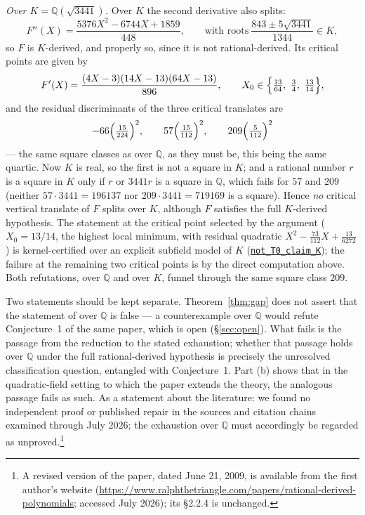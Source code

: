 \documentclass[11pt]{amsart}
\newcommand{\Q}{\mathbb{Q}}
\newcommand{\repourl}{https://github.com/hirokifukui/rd-quartics-classification}
\newcommand{\repotag}{v1.1.0}
\newcommand{\leanline}[3]{\href{\repourl/blob/\repotag/#1\#L#2}{\texttt{#3}}}
\begin{document}
\emph{Over $K=\Q(\sqrt{3441})$.}  Over $K$ the second derivative also
splits:
\[
F''(X)=\frac{5376X^2-6744X+1859}{448},\qquad
\text{with roots}\ \frac{843\pm 5\sqrt{3441}}{1344}\in K,
\]
so $F$ is $K$-derived, and properly so, since it is not
rational-derived.  Its critical points are given by
\[
F'(X)=\frac{(4X-3)(14X-13)(64X-13)}{896},\qquad
X_0\in\Bigl\{\tfrac{13}{64},\ \tfrac34,\ \tfrac{13}{14}\Bigr\},
\]
and the residual discriminants of the three critical translates are
\[
-66\Bigl(\tfrac{15}{224}\Bigr)^2,\qquad
57\Bigl(\tfrac{15}{112}\Bigr)^2,\qquad
209\Bigl(\tfrac{5}{112}\Bigr)^2
\]
--- the same square classes as over $\Q$, as they must be, this being
the same quartic.  Now $K$ is real, so the first is not a square in
$K$; and a rational number $r$ is a square in $K$ only if $r$ or
$3441r$ is a square in $\Q$, which fails for $57$ and $209$ (neither
$57\cdot 3441=196137$ nor $209\cdot 3441=719169$ is a square).  Hence
\emph{no} critical vertical translate of $F$ splits over $K$, although
$F$ satisfies the full $K$-derived hypothesis.  The statement at the
critical point selected by the argument ($X_0=13/14$, the highest local
minimum, with residual quadratic
$X^2-\tfrac{73}{112}X+\tfrac{13}{6272}$) is kernel-certified over an
explicit subfield model of $K$
(\leanline{Gap/BMThm7Transcript.lean}{977}{not\_T0\_claim\_K}); the
failure at the remaining two critical points is by the direct
computation above.  Both refutations, over $\Q$ and over $K$, funnel
through the same square class $209$.

Two statements should be kept separate.
Theorem~\ref{thm:gap} does not assert that the statement of
{\cite[Thm.~7]{BM2000}} over $\Q$ is false --- a counterexample over
$\Q$ would refute Conjecture~1 of the same paper, which is open
(\S\ref{sec:open}).  What fails is the passage from the reduction to
the stated exhaustion; whether that passage holds over $\Q$ under the
full rational-derived hypothesis is precisely the unresolved
classification question, entangled with Conjecture~1.  Part (b) shows
that in the quadratic-field setting to which the paper extends the
theory, the analogous passage fails as such.  As a statement about the
literature: we found no independent proof or published repair in the
sources and citation chains examined through July 2026; the exhaustion
over $\Q$ must accordingly be regarded as unproved.\footnote{A
revised version of the paper, dated June 21, 2009, is available from
the first author's website
(\url{https://www.ralphthetriangle.com/papers/rational-derived-polynomials};
accessed July 2026); its \S2.2.4 is unchanged.}
\end{document}
